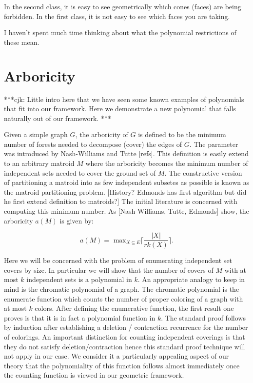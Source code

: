 \documentclass[12pt]{amsart}
\begin{document}
In the second class, it is easy to see geometrically which cones (faces) are being forbidden.  In the first class, it is not easy to see which faces you are taking.  

I haven't spent much time thinking about what the polynomial restrictions of these mean.  

\section{Arboricity}

***cjk: Little intro here that we have seen some known examples of
polynomials that fit into our framework.  Here we demonstrate a new polynomial 
that falls naturally out of our framework. ***


Given a simple graph $G$, the arboricity of $G$ is defined to be the
minimum number of forests needed to decompose (cover) the edges of
$G$.  The parameter was introduced by Nash-Williams and Tutte [refs].
This definition is easily extend to an arbitrary matroid $M$ where the
arboricity becomes the minimum number of independent sets needed to
cover the ground set of $M$.  The constructive version of partitioning
a matroid into as few independent subsetes as possible is known as the
matroid partitioning problem. [History?  Edmonds has first algorithm
  but did he first extend definition to matroids?]  The initial
literature is concerned with computing this minimum number.  As
[Nash-Williams, Tutte, Edmonds] show, the arboricity $a(M)$ is given
by:

$$ a(M) = \textrm{ max}_{X\subseteq E} \lceil { \frac{|X|}{rk(X)}} \rceil . $$

Here we will be concerned with the problem of enumerating independent
set covers by size.  In particular we will show that the number of
covers of $M$ with at most $k$ independent sets is a polynomial in
$k$.  An appropriate analogy to keep in mind is the chromatic
polynomial of a graph.  The chromatic polynomial is the enumerate
function which counts the number of proper coloring of a graph with at
most $k$ colors.  After defining the enumerative function, the first
result one proves is that it is in fact a polynomial function in $k$.
The standard proof follows by induction after establishing a deletion
/ contraction recurrence for the number of colorings.  An important
distinction for counting independent coverings is that they do not
satisfy deletion/contraction hence this standard proof technique will
not apply in our case.  We consider it a particularly appealing aspect
of our theory that the polynomiality of this function follows almost
immediately once the counting function is viewed in our geometric
framework.
\end{document}

